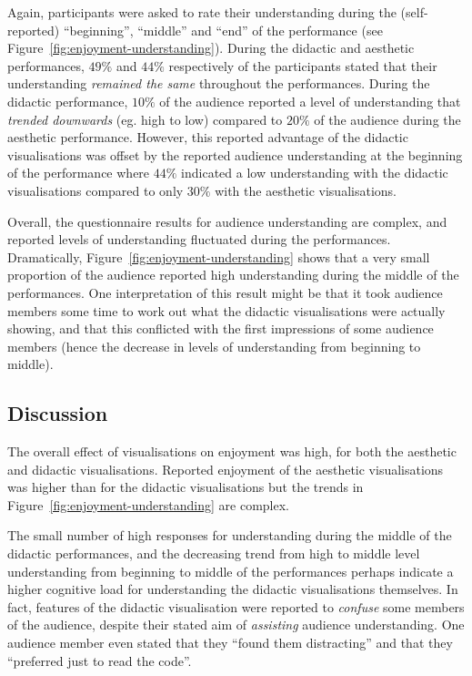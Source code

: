 \documentclass{sig-alternate}
\begin{document}
Again, participants were asked to rate their understanding during the
(self-reported) ``beginning'', ``middle'' and ``end'' of the
performance (see Figure~\ref{fig:enjoyment-understanding}). During the
didactic and aesthetic performances, $49\%$ and $44\%$ respectively of
the participants stated that their understanding \emph{remained the
same} throughout the performances. During the didactic performance,
$10\%$ of the audience reported a level of understanding that
\emph{trended downwards} (eg. high to low) compared to $20\%$ of the
audience during the aesthetic performance. However, this reported
advantage of the didactic visualisations was offset by the reported
audience understanding at the beginning of the performance where
$44\%$ indicated a low understanding with the didactic visualisations
compared to only $30\%$ with the aesthetic visualisations.

Overall, the questionnaire results for audience understanding are
complex, and reported levels of understanding fluctuated during the
performances. Dramatically, Figure~\ref{fig:enjoyment-understanding}
shows that a very small proportion of the audience reported high
understanding during the middle of the performances. One
interpretation of this result might be that it took audience members
some time to work out what the didactic visualisations were actually
showing, and that this conflicted with the first impressions of some
audience members (hence the decrease in levels of understanding from
beginning to middle).

\subsection{Discussion}

The overall effect of visualisations on enjoyment was high, for both
the aesthetic and didactic visualisations. Reported enjoyment of the
aesthetic visualisations was higher than for the didactic
visualisations but the trends in Figure~\ref{fig:enjoyment-understanding}
are complex.

The small number of high responses for understanding during the middle
of the didactic performances, and the decreasing trend from high to
middle level understanding from beginning to middle of the
performances perhaps indicate a higher cognitive load for
understanding the didactic visualisations themselves. In fact,
features of the didactic visualisation were reported to \emph{confuse}
some members of the audience, despite their stated aim of
\emph{assisting} audience understanding. One audience member even
stated that they ``found them distracting'' and that they ``preferred
just to read the code''.
\end{document}
